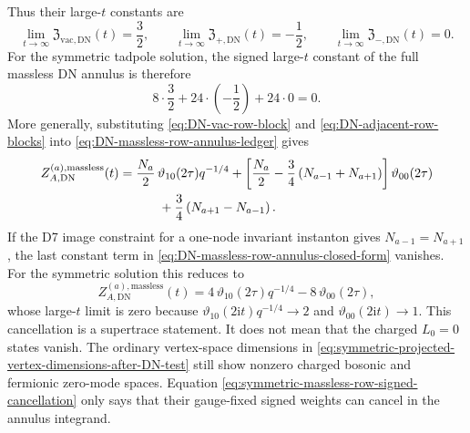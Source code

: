 \documentclass[11pt]{article}
\newcommand{\vac}{\mathrm{vac}}
\newcommand{\DN}{\mathrm{DN}}
\newcommand{\ii}{\mathrm{i}}
\newcommand{\vart}{\vartheta}
\begin{document}
Thus their large-\(t\) constants are
\begin{equation}
  \lim_{t\to\infty}\mathfrak Z_{\vac,\DN}(t)=\frac32,
  \qquad
  \lim_{t\to\infty}\mathfrak Z_{+,\DN}(t)=-\frac12,
  \qquad
  \lim_{t\to\infty}\mathfrak Z_{-,\DN}(t)=0.
  \label{eq:DN-massless-row-large-t-constants}
\end{equation}
For the symmetric tadpole solution, the signed large-\(t\) constant of the full massless DN
annulus is therefore
\begin{equation}
  8\cdot\frac32+24\cdot\left(-\frac12\right)+24\cdot0=0.
  \label{eq:symmetric-massless-row-signed-cancellation}
\end{equation}
More generally, substituting
\eqref{eq:DN-vac-row-block} and \eqref{eq:DN-adjacent-row-blocks} into
\eqref{eq:DN-massless-row-annulus-ledger} gives
\begin{align}
  Z_{A,\DN}^{(a),\mathrm{massless}}(t)
  &=
  \frac{N_a}{2}\,\vart_{10}(2\tau)q^{-1/4}
  +
  \left[
    \frac{N_a}{2}
    -\frac34\left(N_{a-1}+N_{a+1}\right)
  \right]\vart_{00}(2\tau)
  \nonumber\\
  &\hspace{1.1cm}
  +
  \frac34\left(N_{a+1}-N_{a-1}\right).
  \label{eq:DN-massless-row-annulus-closed-form}
\end{align}
If the D7 image constraint for a one-node invariant instanton gives
\(N_{a-1}=N_{a+1}\), the last constant term in
\eqref{eq:DN-massless-row-annulus-closed-form} vanishes. For the symmetric solution this reduces
to
\begin{equation}
  Z_{A,\DN}^{(a),\mathrm{massless}}(t)
  =
  4\,\vart_{10}(2\tau)q^{-1/4}
  -
  8\,\vart_{00}(2\tau),
  \label{eq:symmetric-DN-massless-row-annulus}
\end{equation}
whose large-\(t\) limit is zero because
\(\vart_{10}(2\ii t)q^{-1/4}\to2\) and \(\vart_{00}(2\ii t)\to1\).
This cancellation is a supertrace statement. It does not mean that the charged \(L_0=0\) states
vanish. The ordinary vertex-space dimensions in
\eqref{eq:symmetric-projected-vertex-dimensions-after-DN-test} still show nonzero charged
bosonic and fermionic zero-mode spaces. Equation
\eqref{eq:symmetric-massless-row-signed-cancellation} only says that their gauge-fixed signed
weights can cancel in the annulus integrand.
\end{document}
